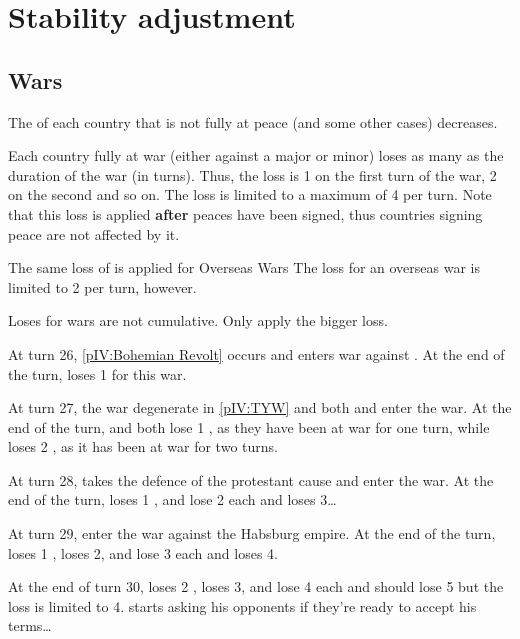 \section{Stability adjustment}\label{chPeace:Stability}
\subsection{Wars}
\aparag The \STAB of each country that is not fully at peace (and some other
cases) decreases.

\bparag Each country fully at war (either against a major or minor) loses as
many \STAB as the duration of the war (in turns).
\bparag Thus, the loss is 1 \STAB on the first turn of the war, 2 on the
second and so on.
\bparag The loss is limited to a maximum of 4 \STAB per turn.
\bparag Note that this loss is applied \textbf{after} peaces have been signed,
thus countries signing peace are not affected by it.

\bparag The same loss of \STAB is applied for Overseas Wars
\bparag The loss for an overseas war is limited to 2 \STAB per turn, however.

 Loses for wars are not cumulative. Only apply the
bigger loss.

\begin{exemple}
  At turn 26, \ref{pIV:Bohemian Revolt} occurs and \AUS enters war against
  \paysBoheme. At the end of the turn, \AUS loses 1 \STAB for this war.

  At turn 27, the war degenerate in \ref{pIV:TYW} and both \HIS and \HOL enter
  the war. At the end of the turn, \HIS and \HOL both lose 1 \STAB, as they
  have been at war for one turn, while \AUS loses 2 \STAB, as it has been at
  war for two turns.

  At turn 28, \SUE takes the defence of the protestant cause and enter the
  war. At the end of the turn, \SUE loses 1 \STAB, \HIS and \HOL lose 2 each
  and \AUS loses 3\ldots

  At turn 29, \FRA enter the war against the Habsburg empire. At the end of
  the turn, \FRA loses 1 \STAB, \SUE loses 2, \HIS and \HOL lose 3 each and
  \AUS loses 4.

  At the end of turn 30, \FRA loses 2 \STAB, \SUE loses 3, \HOL and \HIS lose
  4 each and \AUS should lose 5 but the loss is limited to
  4. \ministreRichelieu starts asking his opponents if they're ready to accept
  his terms\ldots
\end{exemple}

